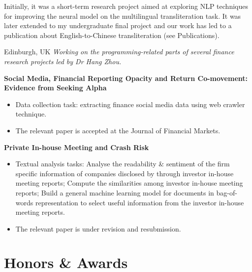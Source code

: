 \documentclass[%
               doublesided,
               paper=a4,
               fontsize=11pt
              ]{my-resume}
\begin{document}
\smallskip
{\small Initially, it was a short-term research project aimed at exploring NLP techniques for improving the neural model on the multilingual transliteration task. It was later extended to my undergraduate final project and our work has led to a publication about English-to-Chinese transliteration (see Publications)}.

\divider

     {Edinburgh, UK}
\textit{\small Working on the programming-related parts of several finance research projects led by Dr Hang Zhou.}
\smallskip

{\small
\textbf{Social Media, Financial Reporting Opacity and Return Co-movement: Evidence from Seeking Alpha}
\smallskip
\begin{itemize}
    \item Data collection task: extracting finance social media data using web crawler technique.
    \item The relevant paper is accepted at the Journal of Financial Markets.
\end{itemize}
\smallskip

\textbf{Private In-house Meeting and Crash Risk}
\begin{itemize}
    \item Textual analysis tasks:  Analyse the readability \& sentiment of the firm specific information of companies disclosed by through investor in-house meeting reports; 
     Compute the similarities among investor in-house meeting reports;
     Build a general machine learning model for documents in bag-of-words representation to select useful information from the investor in-house meeting reports.
    \item The relevant paper is under revision and resubmission.
\end{itemize}
}

\divider

    
\section{Honors \& Awards}

\end{document}
